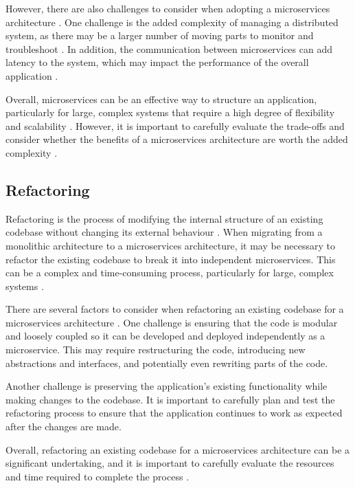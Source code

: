 \documentclass[conference]{IEEEtran}
\begin{document}
However, there are also challenges to consider when adopting a microservices
architecture \cite{fowler-microservices-tradeoffs}. One challenge is the added
complexity of managing a distributed system, as there may be a larger number of
moving parts to monitor and troubleshoot \cite{newman2021building}. In
addition, the communication between microservices can add latency to the
system, which may impact the performance of the overall application
\cite{fowler-microservices-tradeoffs,pautasso2017microservices}.

Overall, microservices can be an effective way to structure an application,
particularly for large, complex systems that require a high degree of
flexibility and scalability \cite{newman2021building}. However, it is important
to carefully evaluate the trade-offs and consider whether the benefits of a
microservices architecture are worth the added complexity
\cite{fowler-microservices-tradeoffs}.

\subsection{Refactoring}

Refactoring is the process of modifying the internal structure of an existing
codebase without changing its external behaviour \cite{becker1999refactoring}.
When migrating from a monolithic architecture to a microservices architecture,
it may be necessary to refactor the existing codebase to break it into
independent microservices. This can be a complex and time-consuming process,
particularly for large, complex systems \cite{newman2019monolith}.

There are several factors to consider when refactoring an existing codebase for
a microservices architecture \cite{newman2019monolith}. One challenge is
ensuring that the code is modular and loosely coupled so it can be developed
and deployed independently as a microservice. This may require restructuring
the code, introducing new abstractions and interfaces, and potentially even
rewriting parts of the code.

Another challenge is preserving the application's existing functionality while
making changes to the codebase. It is important to carefully plan and test the
refactoring process to ensure that the application continues to work as
expected after the changes are made.

Overall, refactoring an existing codebase for a microservices architecture can
be a significant undertaking, and it is important to carefully evaluate the
resources and time required to complete the process \cite{newman2019monolith}.
\end{document}
